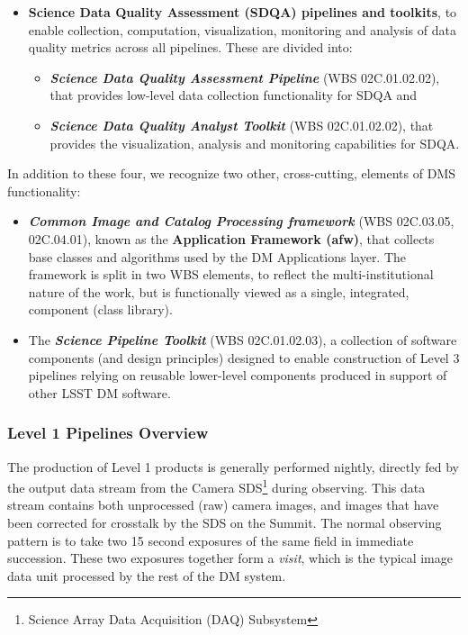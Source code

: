 \documentclass[12pt]{article}
\newcommand{\wbsSDQAP}{WBS 02C.01.02.02}
\newcommand{\wbsSDQAT}{WBS 02C.01.02.02}
\newcommand{\wbsSPT}{WBS 02C.01.02.03}
\newcommand{\wbsAFW}{WBS 02C.03.05, 02C.04.01}
\begin{document}
\begin{itemize}
       \item {\bf Science Data Quality Assessment (SDQA) pipelines and toolkits}, to enable collection, computation, visualization, monitoring and analysis of data quality metrics across all pipelines. These are divided into:
       \begin{itemize}
           \item {\bf \emph{Science Data Quality Assessment Pipeline}} (\wbsSDQAP), that provides low-level data collection functionality for SDQA and
           \item {\bf \emph{Science Data Quality Analyst Toolkit}} (\wbsSDQAT), that provides the visualization, analysis and monitoring capabilities for SDQA.
       \end{itemize}

\end{itemize}

In addition to these four, we recognize two other, cross-cutting, elements of DMS functionality:

\begin{itemize}
       \item {\bf \emph{Common Image and Catalog Processing framework}} (\wbsAFW), known as the {\bf Application Framework (afw)}, that collects base classes and algorithms %
         used by the DM Applications layer. The framework is split in two WBS elements, to reflect the multi-institutional nature of the work, but is functionally viewed as a single, integrated, component (class library).
       \item The {\bf \emph{Science Pipeline Toolkit}} (\wbsSPT), a collection of software components (and design principles) designed to enable construction of Level 3 pipelines relying on reusable lower-level components produced in support of other LSST DM software.
\end{itemize}

\subsubsection{Level 1 Pipelines Overview}
The production of Level 1 products is generally performed nightly, directly fed by 
the output data stream from the Camera SDS\footnote{Science Array Data Acquisition (DAQ) Subsystem} during observing. This data stream
contains both unprocessed (raw) camera images, and images that have been corrected
for crosstalk by the SDS on the Summit.  The normal observing
pattern is to take two 15 second exposures of the same field in immediate
succession.  These two exposures together form a {\em visit}, which is the typical
image data unit processed by the rest of the DM system.
\\
\end{document}
